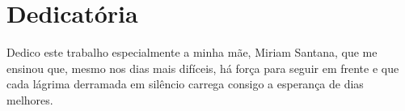 \chapter*{Dedicatória}
  \vspace*{\fill}
  \noindent
  \hspace{2em}Dedico este trabalho especialmente a minha mãe, Miriam Santana, que me ensinou que, mesmo nos dias mais difíceis, há força para seguir em frente e que cada lágrima derramada em silêncio carrega consigo a esperança de dias melhores.
  \vspace*{\fill}
